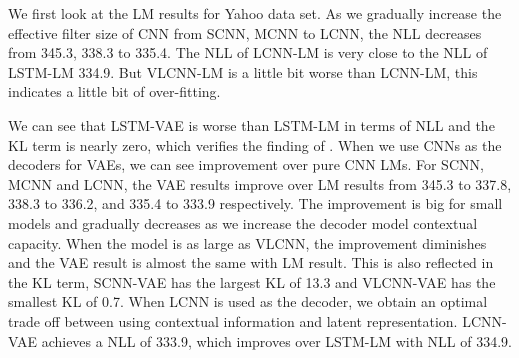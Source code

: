 \documentclass{article}
\begin{document}
We first look at the LM results for Yahoo data set. As we gradually increase
the effective filter size of CNN from SCNN, MCNN to LCNN, the NLL decreases from
345.3, 338.3 to 335.4. The NLL of LCNN-LM is very close to the NLL of LSTM-LM
334.9. But VLCNN-LM is a little bit worse than LCNN-LM, this indicates a little
bit of over-fitting.

We can see that LSTM-VAE is worse than LSTM-LM in terms of NLL and the KL
term is nearly zero, which verifies the finding
of \cite{bowman2015generating}. When we use CNNs as the decoders for VAEs,
we can see improvement over pure CNN LMs. For SCNN, MCNN and LCNN,
the VAE results improve over LM results from 345.3 to 337.8, 338.3 to 336.2, and 335.4 to 333.9
respectively. The improvement is big for small models and gradually decreases
as we increase the decoder model contextual capacity. When the model is as large as VLCNN,
the improvement diminishes and the VAE result is almost the same with LM result.
This is also reflected in the KL term, SCNN-VAE has
the largest KL of 13.3 and VLCNN-VAE has the smallest KL of 0.7.
When LCNN is used as the decoder, we obtain an optimal trade off between using
contextual information and latent representation. LCNN-VAE achieves a
NLL of 333.9, which improves over LSTM-LM with NLL of 334.9.
\end{document}
